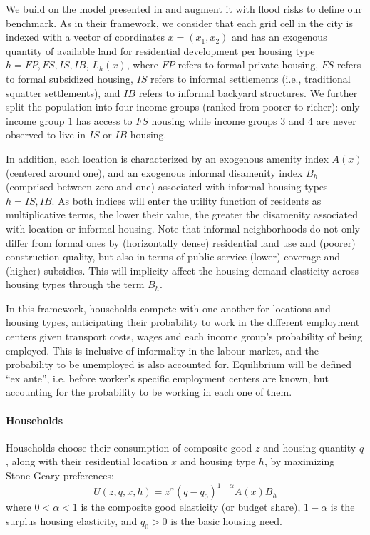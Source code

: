\documentclass[12pt]{article}
\begin{document}
We build on the model presented in \citet{Pfeiffer2025AssessingHousing} and augment it with flood risks to define our benchmark. As in their framework, we consider that each grid cell in the city is indexed with a vector of coordinates $x=(x_1,x_2)$ and has an exogenous quantity of available land for residential development per housing type $h = FP,FS,IS,IB$, $L_h(x)$, where $FP$ refers to formal private housing, $FS$ refers to formal subsidized housing, $IS$ refers to informal settlements (i.e., traditional squatter settlements), and $IB$ refers to informal backyard structures. We further split the population into four income groups (ranked from poorer to richer): only income group $1$ has access to $FS$ housing while income groups $3$ and $4$ are never observed to live in $IS$ or $IB$ housing.

In addition, each location is characterized by an exogenous amenity index $A(x)$ (centered around one), and an exogenous informal disamenity index $B_h$ (comprised between zero and one) associated with informal housing types $h = IS,IB$. As both indices will enter the utility function of residents as multiplicative terms, the lower their value, the greater the disamenity associated with location or informal housing. Note that informal neighborhoods do not only differ from formal ones by (horizontally dense) residential land use and (poorer) construction quality, but also in terms of public service (lower) coverage and (higher) subsidies. This will implicity affect the housing demand elasticity across housing types through the term $B_h$.

In this framework, households compete with one another for locations and housing types, anticipating their probability to work in the different employment centers given transport costs, wages and each income group's probability of being employed. This is inclusive of informality in the labour market, and the probability to be unemployed is also accounted for. Equilibrium will be defined ``ex ante'', i.e. before  worker's specific employment centers are known, but accounting for the probability to be working in each one of them.

\paragraph{Households}

Households choose their consumption of composite good $z$ and housing quantity $q$, along with their residential location $x$ and housing type $h$, by maximizing Stone-Geary preferences:
\begin{equation}
\label{eq:utility}
    U(z,q,x,h) = z^\alpha (q-q_0)^{1-\alpha}A(x)B_h
\end{equation}
where $0<\alpha<1$ is the composite good elasticity (or budget share), $1 - \alpha$ is the surplus housing elasticity, and $q_0>0$ is the basic housing need.
\end{document}
